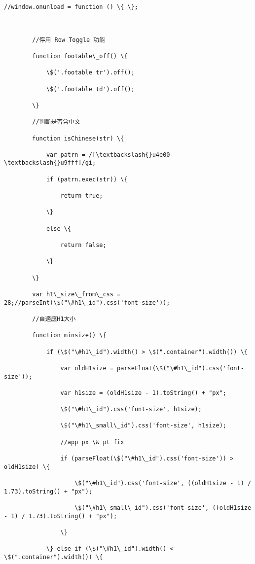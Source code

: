 \documentclass[11pt]{article}
\begin{document}
\begin{Verbatim}[commandchars=\\\{\}]
        //window.onunload = function () \{ \};



        //停用 Row Toggle 功能

        function footable\_off() \{

            \$('.footable tr').off();

            \$('.footable td').off();

        \}

        //判斷是否含中文

        function isChinese(str) \{

            var patrn = /[\textbackslash{}u4e00-\textbackslash{}u9fff]/gi;

            if (patrn.exec(str)) \{

                return true;

            \}

            else \{

                return false;

            \}

        \}

        var h1\_size\_from\_css = 28;//parseInt(\$("\#h1\_id").css('font-size'));

        //自適應H1大小

        function minsize() \{

            if (\$("\#h1\_id").width() > \$(".container").width()) \{

                var oldH1size = parseFloat(\$("\#h1\_id").css('font-size'));

                var h1size = (oldH1size - 1).toString() + "px";

                \$("\#h1\_id").css('font-size', h1size);

                \$("\#h1\_small\_id").css('font-size', h1size);

                //app px \& pt fix

                if (parseFloat(\$("\#h1\_id").css('font-size')) > oldH1size) \{

                    \$("\#h1\_id").css('font-size', ((oldH1size - 1) / 1.73).toString() + "px");

                    \$("\#h1\_small\_id").css('font-size', ((oldH1size - 1) / 1.73).toString() + "px");

                \}

            \} else if (\$("\#h1\_id").width() < \$(".container").width()) \{


\end{Verbatim}
\end{document}
